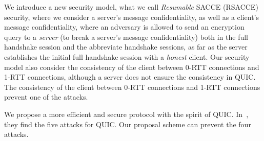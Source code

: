 We introduce a new
security model, what we call \textit{Resumable} SACCE
(RSACCE) security, where we consider a server's message
confidentiality, as well as a client's message
confidentiality, where an adversary is allowed to send
an encryption query to a \textit{server} (to break a
server's message confidentiality) both in the full
handshake session and the abbreviate handshake sessions,
as far as the server establishes the initial full
handshake session with a \textit{honest} client.
Our security model also consider the consistency of the client between
0-RTT connections and 1-RTT connections, although a
server does not ensure the consistency in QUIC.
The consistency of the client between 0-RTT connections
and 1-RTT connections prevent one of the attacks.

We propose a more efficient and secure protocol with
the spirit of QUIC.
In~\cite{LJBN15:QUIC}, they find the five attacks for
QUIC.
Our proposal scheme can prevent the four attacks.